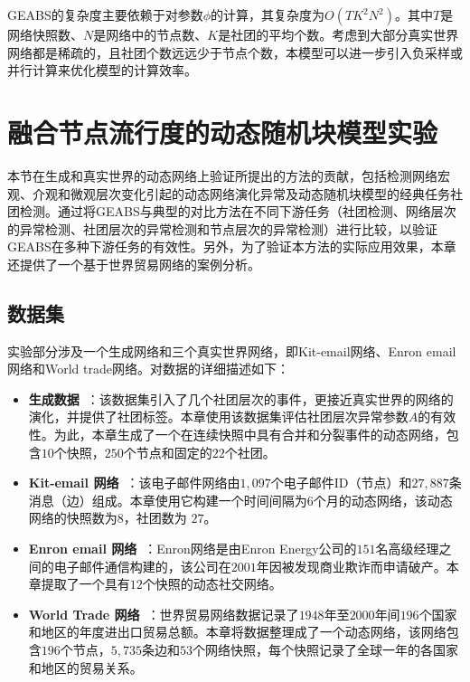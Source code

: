 GEABS的复杂度主要依赖于对参数$\phi$的计算，其复杂度为$O(TK^2N^2)$。其中$T$是网络快照数、$N$是网络中的节点数、$K$是社团的平均个数。考虑到大部分真实世界网络都是稀疏的，且社团个数远远少于节点个数，本模型可以进一步引入负采样或并行计算来优化模型的计算效率。

\section{融合节点流行度的动态随机块模型实验\label{chap4:experiment}}

本节在生成和真实世界的动态网络上验证所提出的方法的贡献，包括检测网络宏观、介观和微观层次变化引起的动态网络演化异常及动态随机块模型的经典任务社团检测。通过将GEABS与典型的对比方法在不同下游任务（社团检测、网络层次的异常检测、社团层次的异常检测和节点层次的异常检测）进行比较，以验证GEABS在多种下游任务的有效性。另外，为了验证本方法的实际应用效果，本章还提供了一个基于世界贸易网络的案例分析。

\subsection{数据集}

实验部分涉及一个生成网络和三个真实世界网络，即Kit-email网络、Enron email网络和World trade网络。对数据的详细描述如下：

\begin{itemize}

\item \textbf{生成数据~\cite{greene2010tracking}}：该数据集引入了几个社团层次的事件，更接近真实世界的网络的演化，并提供了社团标签。本章使用该数据集评估社团层次异常参数$A$的有效性。为此，本章生成了一个在连续快照中具有合并和分裂事件的动态网络，包含$10$个快照，$250$个节点和固定的$22$个社团。

\item \textbf{Kit-email 网络~\cite{gorkedynamic}}：该电子邮件网络由$1,097$个电子邮件ID（节点）和$27,887$条消息（边）组成。本章使用它构建一个时间间隔为$6$个月的动态网络，该动态网络的快照数为$8$，社团数为 $27$。

\item \textbf{Enron email 网络~\cite{benston2002enron}}：Enron网络是由Enron Energy公司的$151$名高级经理之间的电子邮件通信构建的，该公司在$2001$年因被发现商业欺诈而申请破产。本章提取了一个具有$12$个快照的动态社交网络。

\item \textbf{World Trade 网络~\cite{worldset2002}}：世界贸易网络数据记录了$1948$年至$2000$年间$196$个国家和地区的年度进出口贸易总额。本章将数据整理成了一个动态网络，该网络包含$196$个节点，$5,735$条边和$53$个网络快照，每个快照记录了全球一年的各国家和地区的贸易关系。
\end{itemize}





